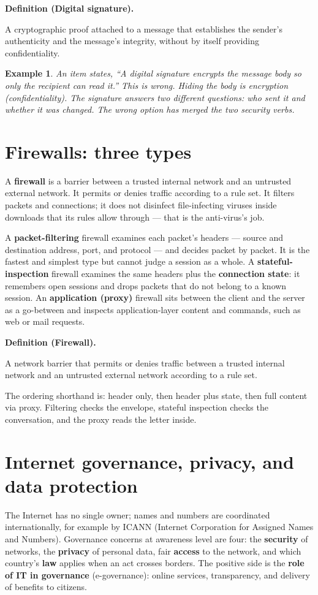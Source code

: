 \documentclass[11pt]{article}
\newtheorem{example}{Example}[section]
\newenvironment{definitionbox}[1]{%
  \par\noindent\textbf{Definition (#1).}\ \itshape
}{\par\vspace{0.3em}}
\begin{document}
\begin{definitionbox}{Digital signature}
A cryptographic proof attached to a message that establishes the sender's
authenticity and the message's integrity, without by itself providing
confidentiality.
\end{definitionbox}

\begin{example}
An item states, ``A digital signature encrypts the message body so only the
recipient can read it.'' This is wrong. Hiding the body is encryption
(confidentiality). The signature answers two different questions: who sent it
and whether it was changed. The wrong option has merged the two security
verbs.
\end{example}

\section{Firewalls: three types}
A \textbf{firewall} is a barrier between a trusted internal network and an
untrusted external network. It permits or denies traffic according to a rule
set. It filters packets and connections; it does not disinfect
file-infecting viruses inside downloads that its rules allow through --- that
is the anti-virus's job.

A \textbf{packet-filtering} firewall examines each packet's headers ---
source and destination address, port, and protocol --- and decides packet by
packet. It is the fastest and simplest type but cannot judge a session as a
whole. A \textbf{stateful-inspection} firewall examines the same headers plus
the \textbf{connection state}: it remembers open sessions and drops packets
that do not belong to a known session. An \textbf{application (proxy)}
firewall sits between the client and the server as a go-between and inspects
application-layer content and commands, such as web or mail requests.

\begin{definitionbox}{Firewall}
A network barrier that permits or denies traffic between a trusted internal
network and an untrusted external network according to a rule set.
\end{definitionbox}

The ordering shorthand is: header only, then header plus state, then full
content via proxy. Filtering checks the envelope, stateful inspection checks
the conversation, and the proxy reads the letter inside.

\section{Internet governance, privacy, and data protection}
The Internet has no single owner; names and numbers are coordinated
internationally, for example by ICANN (Internet Corporation for Assigned
Names and Numbers). Governance concerns at awareness level are four: the
\textbf{security} of networks, the \textbf{privacy} of personal data, fair
\textbf{access} to the network, and which country's \textbf{law} applies when
an act crosses borders. The positive side is the \textbf{role of IT in
governance} (e-governance): online services, transparency, and delivery of
benefits to citizens.
\end{document}
